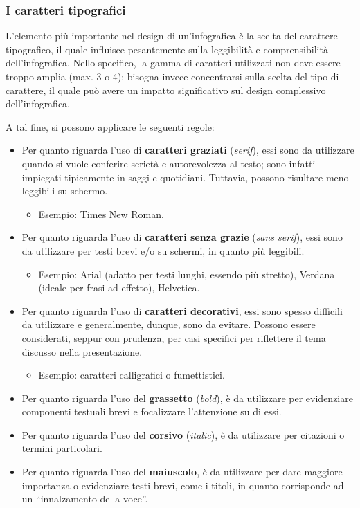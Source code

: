 \subsubsection{I caratteri tipografici}
L'elemento più importante nel design di un'infografica è la scelta del carattere tipografico, il quale influisce pesantemente sulla leggibilità e comprensibilità dell'infografica. 
Nello specifico, la gamma di caratteri utilizzati non deve essere troppo amplia (max. 3 o 4); bisogna invece concentrarsi sulla scelta del tipo di carattere, il quale
può avere un impatto significativo sul design complessivo dell'infografica.

A tal fine, si possono applicare le seguenti regole:
\begin{itemize}
    \item Per quanto riguarda l'uso di \textbf{caratteri graziati} (\emph{serif}), essi sono da utilizzare quando si vuole conferire serietà e autorevolezza al testo; sono infatti impiegati tipicamente in saggi e quotidiani. 
    Tuttavia, possono risultare meno leggibili su schermo.
    \begin{itemize}
        \item Esempio: Times New Roman.
    \end{itemize}
    \item Per quanto riguarda l'uso di \textbf{caratteri senza grazie} (\emph{sans serif}), essi sono da utilizzare per testi brevi e/o su schermi, in quanto più leggibili.
    \begin{itemize}
        \item Esempio: Arial (adatto per testi lunghi, essendo più stretto), Verdana (ideale per frasi ad effetto), Helvetica.
    \end{itemize}
    \item Per quanto riguarda l'uso di \textbf{caratteri decorativi}, essi sono spesso difficili da utilizzare e generalmente, dunque, sono da evitare. Possono essere considerati, seppur con prudenza, per casi specifici per riflettere il tema discusso nella presentazione.
    \begin{itemize}
        \item Esempio: caratteri calligrafici o fumettistici.
    \end{itemize}
    \item Per quanto riguarda l'uso del \textbf{grassetto} (\emph{bold}), è da utilizzare per evidenziare componenti testuali brevi e focalizzare l'attenzione su di essi. 
    \item Per quanto riguarda l'uso del \textbf{corsivo} (\emph{italic}), è da utilizzare per citazioni o termini particolari.
    \item Per quanto riguarda l'uso del \textbf{maiuscolo}, è da utilizzare per dare maggiore importanza o evidenziare testi brevi, come i titoli, in quanto corrisponde ad un ``innalzamento della voce''.
\end{itemize}

